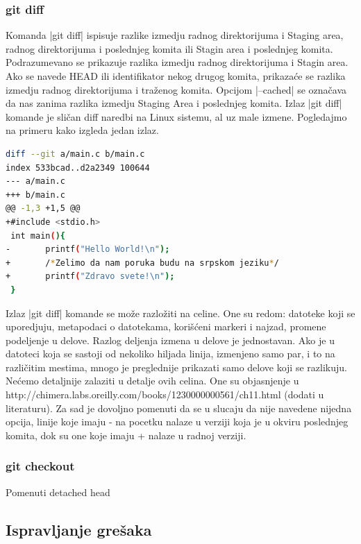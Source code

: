 \documentclass[a4paper]{article}
\begin{document}
{\subsubsection*{git diff}
\label{subsec:git_diff}
Komanda |git diff| ispisuje razlike izmedju radnog direktorijuma i Staging area, radnog direktorijuma i poslednjeg komita ili Stagin area i poslednjeg komita. \\
Podrazumevano se prikazuje razlika izmedju radnog direktorijuma i Stagin area. Ako se navede HEAD ili identifikator nekog drugog komita, prikazaće se razlika izmedju radnog direktorijuma i traženog komita. Opcijom |--cached| se označava da nas zanima razlika izmedju Staging Area i poslednjeg komita.
Izlaz |git diff| komande je sličan diff naredbi na Linux sistemu, al uz male izmene. Pogledajmo na primeru kako izgleda jedan izlaz.
\begin{lstlisting}[language=bash]
diff --git a/main.c b/main.c
index 533bcad..d2a2349 100644
--- a/main.c
+++ b/main.c
@@ -1,3 +1,5 @@
+#include <stdio.h>
 int main(){
-       printf("Hello World!\n");
+       /*Zelimo da nam poruka budu na srpskom jeziku*/
+       printf("Zdravo svete!\n");
 }
\end{lstlisting}
Izlaz |git diff| komande se može razložiti na celine. One su redom: datoteke koji se uporedjuju, metapodaci o datotekama, korišćeni markeri i najzad, promene podeljenje u delove. Razlog deljenja izmena u delove je jednostavan. Ako je u datoteci koja se sastoji od nekoliko hiljada linija, izmenjeno samo par, i to na različitim mestima, mnogo je preglednije prikazati samo delove koji se razlikuju. Nećemo detaljnije zalaziti u detalje ovih celina. One su objasnjenje u http://chimera.labs.oreilly.com/books/1230000000561/ch11.html (dodati u literaturu). Za sad je dovoljno pomenuti da se u slucaju da nije navedene nijedna opcija, linije koje imaju - na pocetku nalaze u verziji koja je u okviru poslednjeg komita, dok su one koje imaju + nalaze u radnoj verziji.


\subsubsection{git checkout}
\label{checkout}

Pomenuti detached head

\subsection{Ispravljanje grešaka}
\label{subsec:greske}

}
\end{document}
